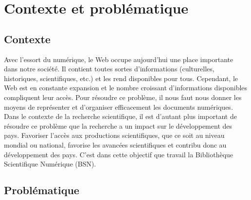   \chapter{Contexte et problématique}
    \section{Contexte}
      Avec l'essort du numérique, le Web occupe aujourd'hui une place importante
      dans notre société. Il contient toutes sortes d'informations (culturelles,
      historiques, scientifiques, etc.) et les rend disponibles pour tous.
      Cependant, le Web est en constante expansion et le nombre croissant
      d'informations disponibles compliquent leur accès. Pour résoudre ce
      problème, il nous faut nous donner les moyens de représenter et
      d'organiser efficacement les documents numériques. Dans le contexte de la
      recherche scientifique, il est d'autant plus important de résoudre ce
      problème que la recherche a un impact sur le développement des pays.
      Favoriser l'accès aux productions scientifiques, que ce soit au niveau
      mondial ou national, favorise les avancées scientifiques et contribu donc
      au développement des pays. C'est dans cette objectif que travail la
      Bibliothèque Scientifique Numérique (BSN).

    \section{Problématique}

